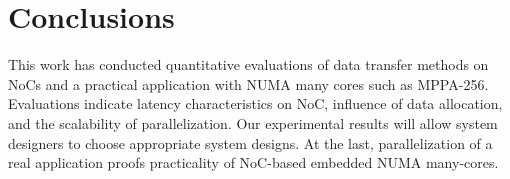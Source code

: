 \documentclass[conference,compsoc]{IEEEtran}
\begin{document}

\vspace{-3mm}
\section{Conclusions}
\label{sec:conclusion}
\vspace{-3mm}
This work has conducted quantitative evaluations of data transfer methods on NoCs and a practical application with NUMA many cores such as MPPA-256.
Evaluations indicate latency characteristics on NoC, influence of data allocation, and the scalability of parallelization.
Our experimental results will allow system designers to choose appropriate system designs.
At the last, parallelization of a real application proofs practicality of NoC-based embedded NUMA many-cores.
\end{document}
